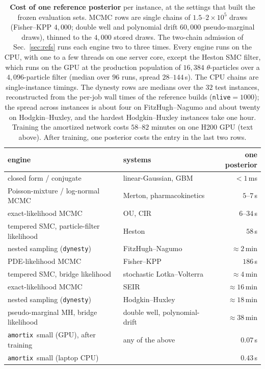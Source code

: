\documentclass[10pt]{article}
\newcommand{\amortix}{\texttt{amortix}}
\begin{document}
\begin{table}[t]
\centering
\small
\begin{tabular}{@{}llr@{}}
\toprule
engine & systems & one posterior \\
\midrule
closed form / conjugate & linear-Gaussian, GBM & ${<}1$\,ms \\
Poisson-mixture / log-normal MCMC & Merton, pharmacokinetics & $5$--$7$\,s \\
exact-likelihood MCMC & OU, CIR & $6$--$34$\,s \\
tempered SMC, particle-filter likelihood & Heston & $58$\,s \\
nested sampling (\texttt{dynesty}) & FitzHugh--Nagumo & ${\approx}2$\,min \\
PDE-likelihood MCMC & Fisher--KPP & $186$\,s \\
tempered SMC, bridge likelihood & stochastic Lotka--Volterra & ${\approx}4$\,min \\
exact-likelihood MCMC & SEIR & ${\approx}16$\,min \\
nested sampling (\texttt{dynesty}) & Hodgkin--Huxley & ${\approx}18$\,min \\
pseudo-marginal MH, bridge likelihood & double well, polynomial-drift & ${\approx}38$\,min \\
\midrule
\amortix\ small (GPU), after training & any of the above & $0.07$\,s \\
\amortix\ small (laptop CPU) & & $0.43$\,s \\
\bottomrule
\end{tabular}
\caption{\textbf{Cost of one reference posterior} per instance, at the settings that built the frozen
evaluation sets. MCMC rows are single chains of $1.5$--$2 \times 10^5$ draws (Fisher--KPP $4{,}000$;
double well and polynomial drift $60{,}000$ pseudo-marginal draws), thinned to the $4{,}000$ stored
draws. The two-chain admission of Sec.~\ref{sec:refs} runs each engine two to three times. Every
engine runs on the CPU, with one to a few threads on one server core, except the Heston SMC filter,
which runs on the GPU at the production population of $16{,}384$ $\theta$-particles over a $4{,}096$-particle
filter (median over $96$ runs, spread $28$--$144$\,s). The CPU chains are single-instance timings. The
dynesty rows are medians over the $32$ test instances, reconstructed from the per-job wall times of
the reference builds (\texttt{nlive}${=}1000$); the spread across instances is about four on
FitzHugh--Nagumo and about twenty on Hodgkin--Huxley, and the hardest Hodgkin--Huxley instances take
one hour. Training the amortized network costs $58$--$82$ minutes on one H200 GPU (text above). After
training, one posterior costs the entry in the last two rows.}
\label{tab:refcost}
\end{table}
\end{document}
